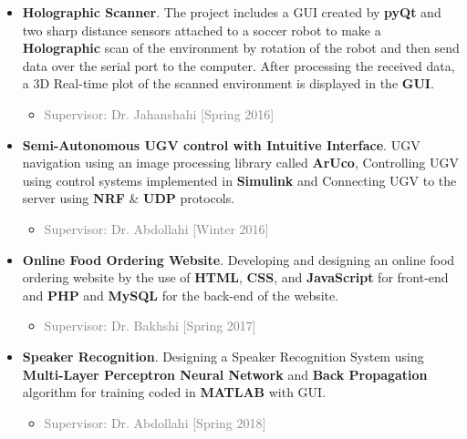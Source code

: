 \documentclass[10pt,a4paper,sans]{moderncv} %
\begin{document}
\begin{itemize}

\item \textbf{Holographic Scanner}. The project includes a GUI created by \textbf{pyQt} and two sharp distance sensors attached to a soccer robot to make a \textbf{Holographic} scan of the environment by rotation of the robot and then send data over the serial port to the computer. After processing the received data, a 3D Real-time plot of the scanned environment is displayed in the \textbf{GUI}.
\begin{itemize}
	\item \textcolor{gray}{Supervisor: Dr. Jahanshahi [Spring 2016]}
	\newline
\end{itemize}

\item \textbf{Semi-Autonomous UGV control with Intuitive Interface}. UGV navigation using an image processing library called \textbf{ArUco}, Controlling UGV using control systems implemented in \textbf{Simulink} and Connecting UGV to the server using \textbf{NRF} \& \textbf{UDP} protocols.
\begin{itemize}
	\item \textcolor{gray}{Supervisor: Dr. Abdollahi [Winter 2016]}
	\newline
\end{itemize}


\item \textbf{Online Food Ordering Website}. Developing and designing an online food ordering website by the use of \textbf{HTML}, \textbf{CSS}, and \textbf{JavaScript} for front-end and \textbf{PHP} and \textbf{MySQL} for the back-end of the website.
\begin{itemize}
	\item \textcolor{gray}{Supervisor: Dr. Bakhshi [Spring 2017]}
	\newline
\end{itemize}

\item \textbf{Speaker Recognition}. Designing a Speaker Recognition System using \textbf{Multi-Layer Perceptron Neural Network} and \textbf{Back Propagation} algorithm for training coded in \textbf{MATLAB} with GUI.
\begin{itemize}
	\item \textcolor{gray}{Supervisor: Dr. Abdollahi [Spring 2018]}
	\newline
\end{itemize}

\end{itemize}
\end{document}
